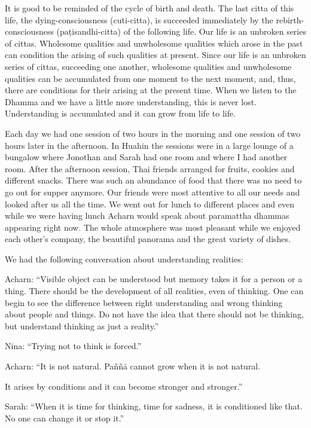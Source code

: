 It is good to be reminded of the cycle of birth and death. The last
citta of this life, the dying-consciousness (cuti-citta), is succeeded
immediately by the rebirth-consciousness (paṭisandhi-citta) of the
following life. Our life is an unbroken series of cittas. Wholesome
qualities and unwholesome qualities which arose in the past can
condition the arising of such qualities at present. Since our life is an
unbroken series of cittas, succeeding one another, wholesome qualities
and unwholesome qualities can be accumulated from one moment to the next
moment, and, thus, there are conditions for their arising at the present
time. When we listen to the Dhamma and we have a little more
understanding, this is never lost. Understanding is accumulated and it
can grow from life to life.

Each day we had one session of two hours in the morning and one session
of two hours later in the afternoon. In Huahin the sessions were in a
large lounge of a bungalow where Jonothan and Sarah had one room and
where I had another room. After the afternoon session, Thai friends
arranged for fruits, cookies and different snacks. There was such an
abundance of food that there was no need to go out for supper anymore.
Our friends were most attentive to all our needs and looked after us all
the time. We went out for lunch to different places and even while we
were having lunch Acharn would speak about paramattha dhammas appearing
right now. The whole atmosphere was most pleasant while we enjoyed each
other's company, the beautiful panorama and the great variety of dishes.

We had the following conversation about understanding realities:

Acharn: ``Visible object can be understood but memory takes it for a
person or a thing. There should be the development of all realities,
even of thinking. One can begin to see the difference between right
understanding and wrong thinking about people and things. Do not have
the idea that there should not be thinking, but understand thinking as
just a reality.''

Nina: ``Trying not to think is forced.''

Acharn: ``It is not natural. Paññā cannot grow when it is not natural.

It arises by conditions and it can become stronger and stronger.''

Sarah: ``When it is time for thinking, time for sadness, it is
conditioned like that. No one can change it or stop it.''


